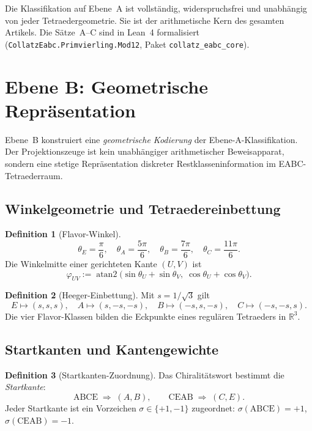 \documentclass[11pt,a4paper]{article}
\theoremstyle{definition}
\newtheorem{definition}{Definition}[section]
\theoremstyle{plain}
\newcommand{\R}{\mathbb{R}}
\begin{document}
	Die Klassifikation auf Ebene~A ist vollständig, widerspruchsfrei und unabhängig von jeder Tetraedergeometrie. Sie ist der arithmetische Kern des gesamten Artikels. Die Sätze~A--C sind in Lean~4 formalisiert (\texttt{CollatzEabc.Primvierling.Mod12}, Paket \texttt{collatz\_eabc\_core}).
	
	\section{Ebene B: Geometrische Repräsentation}
	
	Ebene~B konstruiert eine \emph{geometrische Kodierung} der Ebene-A-Klassifikation. Der Projektionszeuge ist kein unabhängiger arithmetischer Beweisapparat, sondern eine stetige Repräsentation diskreter Restklasseninformation im EABC-Tetraederraum.
	
	\subsection{Winkelgeometrie und Tetraedereinbettung}
	
	\begin{definition}[Flavor-Winkel]
		\[
		\theta_E=\frac{\pi}{6},\quad
		\theta_A=\frac{5\pi}{6},\quad
		\theta_B=\frac{7\pi}{6},\quad
		\theta_C=\frac{11\pi}{6}.
		\]
		Die Winkelmitte einer gerichteten Kante $(U,V)$ ist
		\[
		\varphi_{UV}:=\operatorname{atan2}\bigl(\sin\theta_U+\sin\theta_V,\;\cos\theta_U+\cos\theta_V\bigr).
		\]
	\end{definition}
	
	\begin{definition}[Heeger-Einbettung]
		Mit $s=1/\sqrt{3}$ gilt
		\[
		E\mapsto (s,s,s),\quad
		A\mapsto (s,-s,-s),\quad
		B\mapsto (-s,s,-s),\quad
		C\mapsto (-s,-s,s).
		\]
		Die vier Flavor-Klassen bilden die Eckpunkte eines regulären Tetraeders in $\R^3$.
	\end{definition}
	
	\subsection{Startkanten und Kantengewichte}
	
	\begin{definition}[Startkanten-Zuordnung]
		Das Chiralitätswort bestimmt die \emph{Startkante}:
		\[
		\mathrm{ABCE}\;\Longrightarrow\;(A,B),\qquad
		\mathrm{CEAB}\;\Longrightarrow\;(C,E).
		\]
		Jeder Startkante ist ein Vorzeichen $\sigma\in\{+1,-1\}$ zugeordnet: $\sigma(\mathrm{ABCE})=+1$, $\sigma(\mathrm{CEAB})=-1$.
	\end{definition}
	
\end{document}
